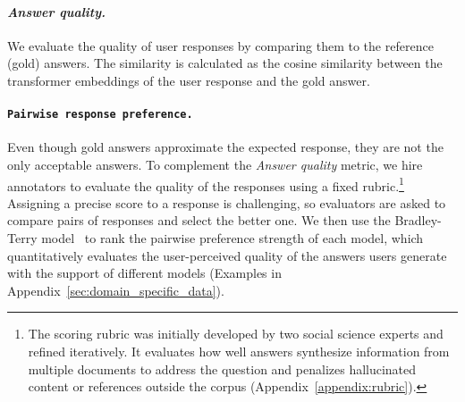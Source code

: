 \paragraph{\textit{Answer quality.}}
%
We evaluate the quality of user responses by comparing them to the
reference (gold) answers. The similarity is calculated as the cosine
similarity between the transformer embeddings of the user response and
the gold answer.

\paragraph{\texttt{Pairwise response preference.}}
%
Even though gold answers approximate the expected response, they are not the only acceptable answers. 
%
To complement the {\it Answer quality} metric, we hire annotators to evaluate the quality of the responses using a fixed
rubric.\footnote{The scoring rubric was initially developed by two
social science experts and refined iteratively. It evaluates how well
answers synthesize information from multiple documents to address the
question and penalizes hallucinated content or references outside the
corpus (Appendix~\ref{appendix:rubric}).}
%
Assigning a precise score to a response is challenging, so evaluators
are asked to compare pairs of responses and select the better
one.
%
We then use the Bradley-Terry model~\cite{Bradley1952RankAO} to rank
the pairwise preference strength of each model, which quantitatively evaluates the user-perceived quality of the answers
users generate with the support of different models
(Examples in Appendix~\ref{sec:domain_specific_data}).
%
%

